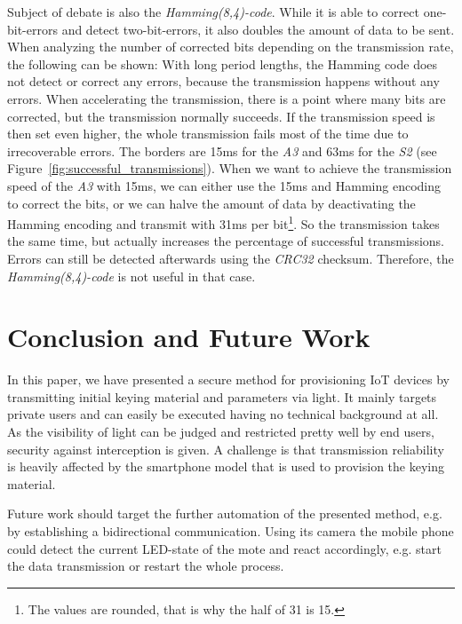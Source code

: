 \documentclass{sig-alternate} %
\begin{document}
Subject of debate is also the \textit{Hamming(8,4)-code}.
While it is able to correct one-bit-errors and detect two-bit-errors, it also doubles the amount of data to be sent.
When analyzing the number of corrected bits depending on the transmission rate, the following can be shown:
With long period lengths, the Hamming code does not detect or correct any errors, because the transmission happens without any errors.
When accelerating the transmission, there is a point where many bits are corrected, but the transmission normally succeeds.
If the transmission speed is then set even higher, the whole transmission fails most of the time due to irrecoverable errors.
The borders are 15ms for the \textit{A3} and 63ms for the \textit{S2} (see Figure~\ref{fig:successful_transmissions}).
When we want to achieve the transmission speed of the \textit{A3} with 15ms, we can either use the 15ms and Hamming encoding to correct the bits, or we can halve the amount of data by deactivating the Hamming encoding and transmit with 31ms per bit\footnote{The values are rounded, that is why the half of 31 is 15.}.
So the transmission takes the same time, but actually increases the percentage of successful transmissions.
Errors can still be detected afterwards using the \textit{CRC32} checksum.
Therefore, the \textit{Hamming(8,4)-code} is not useful in that case.



\section{Conclusion and Future Work}
\label{sec:future_work}

In this paper, we have presented a secure method for provisioning IoT devices by transmitting initial keying material and parameters via light.
It mainly targets private users and can easily be executed having no technical background at all.
As the visibility of light can be judged and restricted pretty well by end users, security against interception is given.
A challenge is that transmission reliability is heavily affected by the smartphone model that is used to provision the keying material.

Future work should target the further automation of the presented method, e.g. by establishing a bidirectional communication.
Using its camera the mobile phone could detect the current LED-state of the mote and react accordingly, e.g. start the data transmission or restart the whole process.
\end{document}
